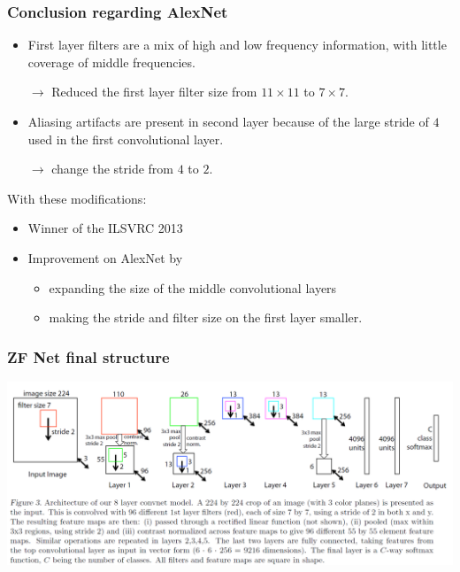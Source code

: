 \begin{frame}
	\frametitle{Conclusion regarding AlexNet}
	
	\begin{itemize}
		\item First layer filters are a mix of high and low frequency information, with little coverage of middle frequencies.
		
		\smallskip
		$\rightarrow$ Reduced the first layer filter size from $11 \times 11$ to $7 \times 7$.
		
		\medskip
		
		\item Aliasing artifacts are present in second layer because of the large stride of $4$ used in the first convolutional layer. 
		
		\smallskip
		$\rightarrow$ change the stride from $4$ to $2$. 
	\end{itemize}

\bigskip

With these modifications: 
\begin{itemize}
	\item Winner of the ILSVRC 2013
	\item Improvement on AlexNet by 
	\begin{itemize}
		\item expanding the size of the middle convolutional layers
		\item making the stride and filter size on the first layer smaller.
	\end{itemize}
\end{itemize}


\end{frame}



\begin{frame}
	\frametitle{ZF Net final structure}
	\begin{center}
		\includegraphics[scale=0.5]{figs/ZFNet_structure}
	\end{center}
	
\end{frame}

